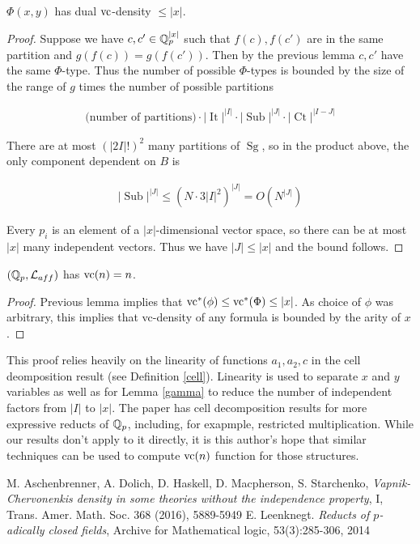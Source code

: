 \documentclass{amsart}
\renewcommand{\LL}{\mathcal L}
\newcommand{\paren}[1]{\left(#1\right)}
\DeclareMathOperator{\Sg}{Sg}
\DeclareMathOperator{\It}{It}
\DeclareMathOperator{\Sub}{Sub}
\DeclareMathOperator{\Ct}{Ct}
\begin{document}
\begin{Corollary}
  $\Phi(x,y)$ has dual $\operatorname{vc}$-density $\leq |x|$.
\end{Corollary}

\begin{proof}
  Suppose we have $c, c' \in \mathbb{Q}_p^{|x|}$ such that $f(c), f(c')$ are in the same partition and $g(f(c)) = g(f(c'))$.
  Then by the previous lemma $c, c'$ have the same $\Phi$-type.
  Thus the number of possible $\Phi$-types is bounded by the size of the range of $g$ times the number of possible partitions
  
  \begin{align*}
    \text{(number of partitions)} \cdot |\It|^{|I|} \cdot |\Sub|^{|J|} \cdot |\Ct|^{|I-J|}
  \end{align*}

  There are at most $\paren{|2I|!}^2$ many partitions of $\Sg$,
  so in the product above, the only component dependent on $B$ is

  \begin{align*}
    |\Sub|^{|J|} \leq (N \cdot 3{|I|}^2)^{|J|} = O(N^{|J|})
  \end{align*}	
  
  Every $p_i$ is an element of a $|x|$-dimensional vector space, so there can be at most $|x|$ many independent vectors.
  Thus we have $|J| \leq |x|$ and the bound follows.
\end{proof}

\begin{Corollary} 
  $(\Q_p, \LL_{aff})$ has $\operatorname{vc}(n) = n$.
\end{Corollary}

\begin{proof}
  Previous lemma implies that $\operatorname{vc}^*(\phi) \leq \operatorname{vc}^*(\Phi) \leq |x|$.
  As choice of $\phi$ was arbitrary, this implies that vc-density of any formula is bounded by the arity of $x$.
\end{proof}

This proof relies heavily on the linearity of functions $a_1, a_2, c$ in the cell deomposition result (see Definition \ref{cell}).
Linearity is used to separate $x$ and $y$ variables as well as
for Lemma \ref{gamma} to reduce the number of independent factors from $|I|$ to $|x|$.
The paper \cite{reduct} has cell decomposition results for more expressive reducts of $\mathbb{Q}_p$,
including, for exapmple, restricted multiplication.
While our results don't apply to it directly,
it is this author's hope that similar techniques can be used to compute $\operatorname{vc}(n)$ function for those structures.

\begin{thebibliography}{9}
  M. Aschenbrenner, A. Dolich, D. Haskell, D. Macpherson, S. Starchenko,
  \textit{Vapnik-Chervonenkis density in some theories without the independence property}, I,
  Trans. Amer. Math. Soc. 368 (2016), 5889-5949
  E. Leenknegt. \textit{Reducts of $p$-adically closed fields}, Archive for Mathematical logic, 53(3):285-306, 2014
\end{thebibliography}
\end{document}
